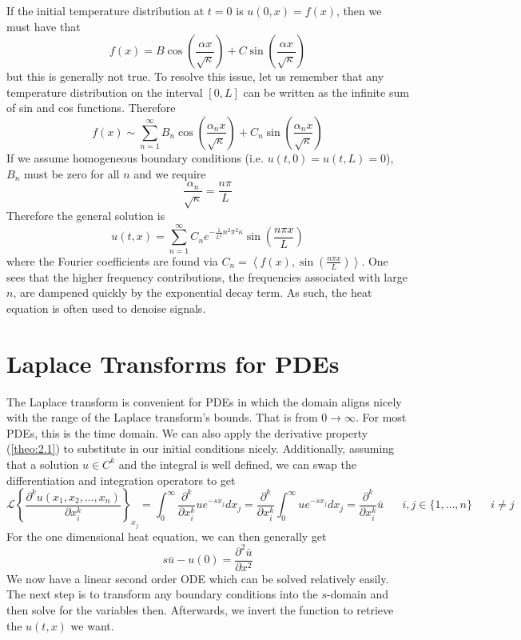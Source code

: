 \documentclass{report}
\theoremstyle{definition}
\theoremstyle{remark}
\newcommand{\lapt}[1]{\mathscr{L}\left\{ #1\right\}}
\newcommand{\twen}{\hspace{20pt}}
\newcommand{\pd}[2]{\frac{\partial #1}{\partial#2}}
\newcommand{\pdt}[2]{\frac{\partial^2 #1}{\partial#2^2}}
\begin{document}
If the initial temperature distribution at $t=0$ is $u(0,x) = f(x)$, then we must have that 
\begin{equation*}
    f(x) =B\cos\left( \frac{\alpha x}{\sqrt \kappa}\right) +C\sin\left( \frac{\alpha x}{\sqrt \kappa}\right)
\end{equation*}
but this is generally not true. To resolve this issue, let us remember that any temperature distribution on the interval $[0,L]$ can be written as the infinite sum of sin and cos functions. Therefore 
\begin{equation*}
    f(x)\sim \sum^\infty_{n=1}B_n\cos\left( \frac{\alpha_n x}{\sqrt \kappa} \right) + C_n\sin\left( \frac{\alpha_n x}{\sqrt \kappa} \right)
\end{equation*}
If we assume homogeneous boundary conditions (i.e. $u(t,0) =u(t,L)=0$), $B_n$ must be zero for all $n$ and we require 
\begin{equation*}
    \frac{\alpha_n}{\sqrt \kappa} = \frac{n\pi}{L}
\end{equation*}
Therefore the general solution is 
\begin{equation*}
    u(t,x) = \sum^\infty_{n=1} C_ne^{-\frac{1}{L^2}n^2\pi^2\kappa}\sin \left( \frac{n\pi x}{L}\right)
\end{equation*}
where the Fourier coefficients are found via $C_n = \left\langle f(x),\sin\left( \frac{n\pi x}{L}\right) \right\rangle $. One sees that the higher frequency contributions, the frequencies associated with large $n$, are dampened quickly by the exponential decay term. As such, the heat equation is often used to denoise signals.

\section{Laplace Transforms for PDEs} 
The Laplace transform is convenient for PDEs in which the domain aligns nicely with the range of the Laplace transform's bounds. That is from $0\rightarrow \infty$. For most PDEs, this is the time domain. We can also apply the derivative property (\ref{theo:2.1}) to substitute in our initial conditions nicely. Additionally, assuming that a solution $u \in C^k$ and the integral is well defined, we can swap the differentiation and integration operators to get 
\begin{equation*}
    \lapt{\pd{^ku(x_1,x_2,\ldots,x_n)}{x_i^k}}_{x_j} = \int^\infty_0 \pd{^k}{x_i^k}ue^{-sx_j}dx_j = \pd{^k}{x_i^k}\int^\infty_0ue^{-sx_j}dx_j = \pd{^k}{x_i^k}\bar{u} \twen i,j \in\{1,\ldots,n\} \twen i\neq j
\end{equation*}
For the one dimensional heat equation, we can then generally get 
\begin{equation*}
    s\bar u - u(0) = \pdt{\bar u}{x}
\end{equation*}
We now have a linear second order ODE which can be solved relatively easily. The next step is to transform any boundary conditions into the $s$-domain and then solve for the variables then. Afterwards, we invert the function to retrieve the $u(t,x)$ we want. 
\end{document}
